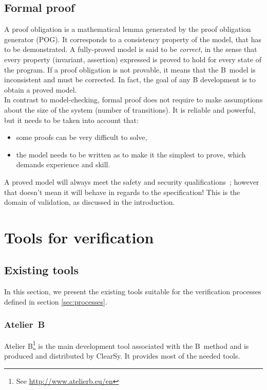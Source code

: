 \documentclass{article}
\begin{document}
\subsection{Formal proof}
A proof obligation is a mathematical lemma generated by the proof obligation generator (POG). It corresponds to a consistency property of the model, that has to be demonstrated.
A fully-proved model is said to be {\itshape correct}, in the sense that every property (invariant, assertion) expressed is proved to hold for every state of the program. If a proof obligation is not provable, it means that the B~model is inconsistent and must be corrected. In fact, the goal of any B development is to obtain a proved model.\\
In contrast to model-checking, formal proof does not require to make assumptions about the size of the system (number of transitions). It is reliable and powerful, but it needs to be taken into account that:
\begin{itemize}
\item some proofs can be very difficult to solve,
\item the model needs to be written as to make it the simplest to prove, which demands experience and skill.
\end{itemize}
A proved model will always meet the safety and security qualifications~; however that doesn't mean it will behave in regards to the specification! This is the domain of validation, as discussed in the introduction.

\section{Tools for verification}
\label{sec:tools}

\subsection{Existing tools}
In this section, we present the existing tools suitable for the verification processes defined in section \ref{sec:processes}.

\subsubsection{Atelier~B}
\label{subsec:atelierb}
Atelier B\footnote{See \url{http://www.atelierb.eu/en}} is the main development tool associated with the B~method and is produced and distributed by ClearSy. It provides most of the needed tools.
\end{document}
